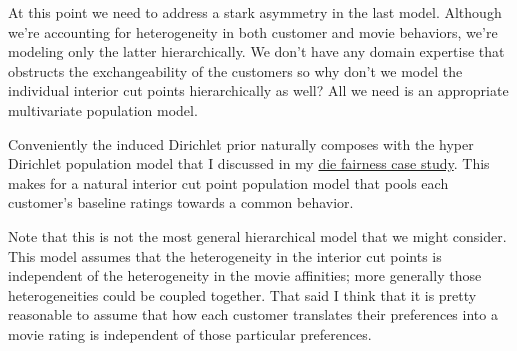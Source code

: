 \documentclass[
  letterpaper,
  DIV=11,
  numbers=noendperiod]{scrartcl}
\begin{document}
At this point we need to address a stark asymmetry in the last model.
Although we're accounting for heterogeneity in both customer and movie
behaviors, we're modeling only the latter hierarchically. We don't have
any domain expertise that obstructs the exchangeability of the customers
so why don't we model the individual interior cut points hierarchically
as well? All we need is an appropriate multivariate population model.

Conveniently the induced Dirichlet prior naturally composes with the
hyper Dirichlet population model that I discussed in my
\href{https://betanalpha.github.io/assets/chapters_html/die_fairness.html}{die
fairness case study}. This makes for a natural interior cut point
population model that pools each customer's baseline ratings towards a
common behavior.

Note that this is not the most general hierarchical model that we might
consider. This model assumes that the heterogeneity in the interior cut
points is independent of the heterogeneity in the movie affinities; more
generally those heterogeneities could be coupled together. That said I
think that it is pretty reasonable to assume that how each customer
translates their preferences into a movie rating is independent of those
particular preferences.
\end{document}
